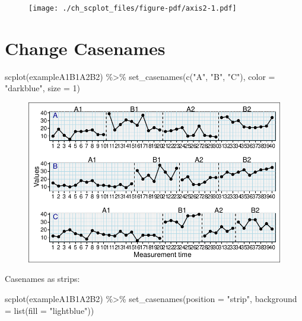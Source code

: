 \documentclass[
  letterpaper,
  DIV=11,
  numbers=noendperiod]{scrreprt}
\newenvironment{Shaded}{\begin{snugshade}}{\end{snugshade}}
\newcommand{\AttributeTok}[1]{\textcolor[rgb]{0.40,0.45,0.13}{#1}}
\newcommand{\DecValTok}[1]{\textcolor[rgb]{0.68,0.00,0.00}{#1}}
\newcommand{\FunctionTok}[1]{\textcolor[rgb]{0.28,0.35,0.67}{#1}}
\newcommand{\NormalTok}[1]{\textcolor[rgb]{0.00,0.23,0.31}{#1}}
\newcommand{\SpecialCharTok}[1]{\textcolor[rgb]{0.37,0.37,0.37}{#1}}
\newcommand{\StringTok}[1]{\textcolor[rgb]{0.13,0.47,0.30}{#1}}
\begin{document}
\begin{figure}[H]

{\centering \texttt{[image: ./ch\_scplot\_files/figure-pdf/axis2-1.pdf]}

}

\end{figure}

\hypertarget{change-casenames}{%
\section{Change Casenames}\label{change-casenames}}

\begin{Shaded}
\begin{Highlighting}[]
\FunctionTok{scplot}\NormalTok{(exampleA1B1A2B2) }\SpecialCharTok{\%\textgreater{}\%}
  \FunctionTok{set\_casenames}\NormalTok{(}\FunctionTok{c}\NormalTok{(}\StringTok{"A"}\NormalTok{, }\StringTok{"B"}\NormalTok{, }\StringTok{"C"}\NormalTok{), }\AttributeTok{color =} \StringTok{"darkblue"}\NormalTok{, }\AttributeTok{size =} \DecValTok{1}\NormalTok{)}
\end{Highlighting}
\end{Shaded}

\begin{figure}[H]

{\centering \includegraphics{./ch_scplot_files/figure-pdf/casenames1-1.pdf}

}

\end{figure}

Casenames as strips:

\begin{Shaded}
\begin{Highlighting}[]
\FunctionTok{scplot}\NormalTok{(exampleA1B1A2B2) }\SpecialCharTok{\%\textgreater{}\%}
  \FunctionTok{set\_casenames}\NormalTok{(}\AttributeTok{position =} \StringTok{"strip"}\NormalTok{, }
                \AttributeTok{background =} \FunctionTok{list}\NormalTok{(}\AttributeTok{fill =} \StringTok{"lightblue"}\NormalTok{))}
\end{Highlighting}
\end{Shaded}
\end{document}
